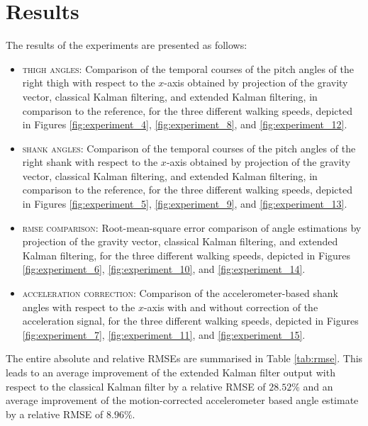 \section{Results}

The results of the experiments are presented as follows:

\begin{itemize}
  \item \textsc{thigh angles:} Comparison of the temporal courses of the pitch angles of the right thigh with respect to the $x$-axis obtained by projection of the gravity vector, classical Kalman filtering, and extended Kalman filtering, in comparison to the reference, for the three different walking speeds, depicted in Figures \ref{fig:experiment_4}, \ref{fig:experiment_8}, and \ref{fig:experiment_12}.
  \item \textsc{shank angles:} Comparison of the temporal courses of the pitch angles of the right shank with respect to the $x$-axis obtained by projection of the gravity vector, classical Kalman filtering, and extended Kalman filtering, in comparison to the reference, for the three different walking speeds, depicted in Figures \ref{fig:experiment_5}, \ref{fig:experiment_9}, and \ref{fig:experiment_13}.
  \item \textsc{rmse comparison:} Root-mean-square error comparison of angle estimations by projection of the gravity vector, classical Kalman filtering, and extended Kalman filtering, for the three different walking speeds, depicted in Figures \ref{fig:experiment_6}, \ref{fig:experiment_10}, and \ref{fig:experiment_14}.
  \item \textsc{acceleration correction:} Comparison of the accelerometer-based shank angles with respect to the $x$-axis with and without correction of the acceleration signal, for the three different walking speeds, depicted in Figures \ref{fig:experiment_7}, \ref{fig:experiment_11}, and \ref{fig:experiment_15}.
\end{itemize}

\noindent
The entire absolute and relative RMSEs are summarised in Table \ref{tab:rmse}. This leads to an average improvement of the extended Kalman filter output with respect to the classical Kalman filter by a relative RMSE of $28.52\%$ and an average improvement of the motion-corrected accelerometer based angle estimate by a relative RMSE of $8.96\%$.

